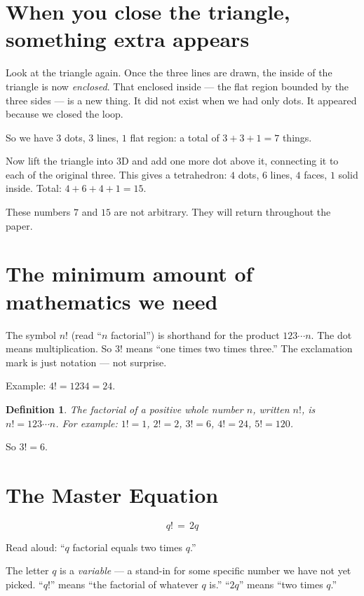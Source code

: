 \documentclass[11pt]{article}
\def\textbf#1{#1}%
\def\cdot{ }%
\newtheorem*{definition}{Definition}
\newcommand{\Master}{\boxed{q!\,=\,2q}}
\begin{document}
\section{When you close the triangle, something extra appears}

Look at the triangle again. Once the three lines are drawn, the inside of the triangle is now \emph{enclosed}. That enclosed inside --- the flat region bounded by the three sides --- is a new thing. It did not exist when we had only dots. It appeared because we closed the loop.

So we have $3$ dots, $3$ lines, $1$ flat region: a total of $3+3+1 = 7$ things.

Now lift the triangle into 3D and add one more dot above it, connecting it to each of the original three. This gives a tetrahedron: $4$ dots, $6$ lines, $4$ faces, $1$ solid inside. Total: $4+6+4+1 = 15$.

These numbers $7$ and $15$ are not arbitrary. They will return throughout the paper.

\section{The minimum amount of mathematics we need}

\begin{mathnote}
The symbol $n!$ (read ``$n$ factorial'') is shorthand for the product $1 \cdot 2 \cdot 3 \cdots n$. The dot $\cdot$ means multiplication. So $3!$ means ``one times two times three.'' The exclamation mark is just notation --- not surprise.

\textbf{Example:} $4! = 1 \cdot 2 \cdot 3 \cdot 4 = 24$.
\end{mathnote}

\begin{definition}
The \textbf{factorial} of a positive whole number $n$, written $n!$, is $n! = 1 \cdot 2 \cdot 3 \cdots n$. For example: $1! = 1$, $2! = 2$, $3! = 6$, $4! = 24$, $5! = 120$.
\end{definition}

So $3! = 6$.

\section{The Master Equation}

\[
\Master
\]
\bigskip

Read aloud: ``$q$ factorial equals two times $q$.''

\begin{mathnote}
The letter $q$ is a \emph{variable} --- a stand-in for some specific number we have not yet picked. ``$q!$'' means ``the factorial of whatever $q$ is.'' ``$2q$'' means ``two times $q$.''
\end{mathnote}
\end{document}
